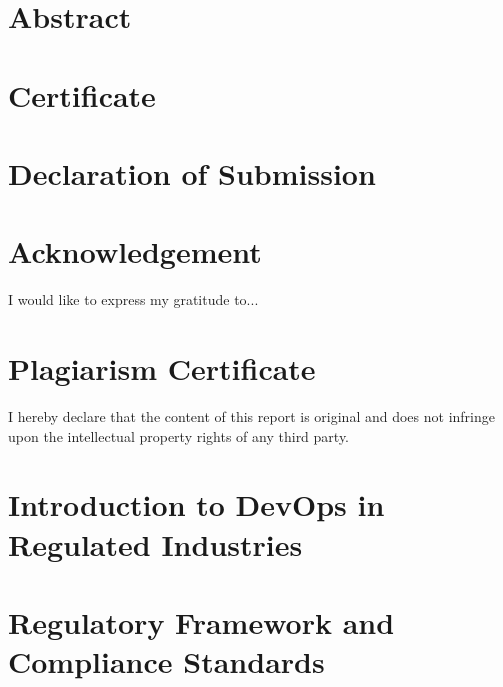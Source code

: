 \documentclass{report}[12pt]
\begin{document}
\tableofcontents

\chapter*{Abstract}

\chapter*{Certificate}

\chapter*{Declaration of Submission}

\chapter*{Acknowledgement}
I would like to express my gratitude to...

\chapter*{Plagiarism Certificate}
I hereby declare that the content of this report is original and does not infringe upon the intellectual property rights of any third party.





\chapter*{Introduction to DevOps in Regulated Industries}

\chapter*{Regulatory Framework and Compliance Standards}
\end{document}
